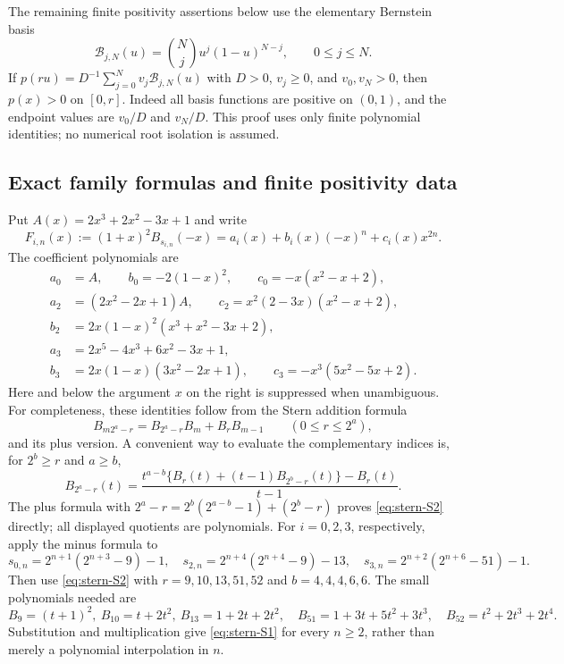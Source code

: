 \documentclass[11pt,a4paper]{article}
\theoremstyle{definition}\newtheorem{definition}[theorem]{Definition}
\theoremstyle{remark}\newtheorem{remark}[theorem]{Remark}
\begin{document}
The remaining finite positivity assertions below use the elementary
Bernstein basis
\[
 \mathcal B_{j,N}(u)=\binom Nj u^j(1-u)^{N-j},\qquad 0\leq j\leq N.
\]
If $p(ru)=D^{-1}\sum_{j=0}^N v_j\mathcal B_{j,N}(u)$ with
$D>0$, $v_j\geq0$, and $v_0,v_N>0$, then $p(x)>0$ on $[0,r]$.
Indeed all basis functions are positive on $(0,1)$, and the endpoint
values are $v_0/D$ and $v_N/D$. This proof uses only finite polynomial
identities; no numerical root isolation is assumed.

\subsection{Exact family formulas and finite positivity data}

Put $A(x)=2x^3+2x^2-3x+1$ and write
\[
 F_{i,n}(x):=(1+x)^2B_{s_{i,n}}(-x)
        =a_i(x)+b_i(x)(-x)^n+c_i(x)x^{2n}.
 \tag{S1}\label{eq:stern-S1}
\]
The coefficient polynomials are
\begin{align*}
 a_0&=A,\qquad b_0=-2(1-x)^2,\qquad c_0=-x(x^2-x+2),\\
 a_2&=(2x^2-2x+1)A,\qquad c_2=x^2(2-3x)(x^2-x+2),\\
 b_2&=2x(1-x)^2(x^3+x^2-3x+2),\\
 a_3&=2x^5-4x^3+6x^2-3x+1,\\
 b_3&=2x(1-x)(3x^2-2x+1),\qquad c_3=-x^3(5x^2-5x+2).
\end{align*}
Here and below the argument $x$ on the right is suppressed when
unambiguous. For completeness, these identities follow from the Stern
addition formula
\[
 B_{m2^a-r}=B_{2^a-r}B_m+B_rB_{m-1}
 \qquad(0\leq r\leq2^a),
\]
and its plus version. A convenient way to evaluate the complementary
indices is, for $2^b\geq r$ and $a\geq b$,
\[
 B_{2^a-r}(t)=
 \frac{t^{a-b}\{B_r(t)+(t-1)B_{2^b-r}(t)\}-B_r(t)}{t-1}.
 \tag{S2}\label{eq:stern-S2}
\]
The plus formula with
$2^a-r=2^b(2^{a-b}-1)+(2^b-r)$ proves \eqref{eq:stern-S2} directly;
all displayed quotients are polynomials.
For $i=0,2,3$, respectively, apply the minus formula to
\[
 s_{0,n}=2^{n+1}(2^{n+3}-9)-1,\quad
 s_{2,n}=2^{n+4}(2^{n+4}-9)-13,\quad
 s_{3,n}=2^{n+2}(2^{n+6}-51)-1.
\]
Then use \eqref{eq:stern-S2} with $r=9,10,13,51,52$ and
$b=4,4,4,6,6$. The small polynomials needed are
\[
 B_9=(t+1)^2,\ B_{10}=t+2t^2,\ B_{13}=1+2t+2t^2,
 \quad B_{51}=1+3t+5t^2+3t^3,\quad B_{52}=t^2+2t^3+2t^4.
\]
Substitution and multiplication give \eqref{eq:stern-S1} for every
$n\geq2$, rather than merely a polynomial interpolation in $n$.
\end{document}
